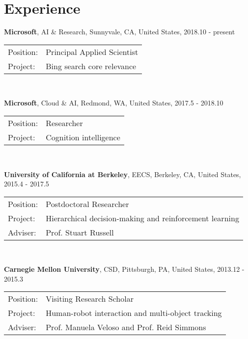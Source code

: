 \documentclass[letterpaper,10pt]{article}
\renewenvironment{itemize}{
  \begin{list}{}{
    \setlength{\leftmargin}{1.5em}
  }
}{
  \end{list}
}
\begin{document}
\section*{Experience}
\begin{itemize}
	\item \textbf{Microsoft}, AI \& Research, Sunnyvale, CA, United States, 2018.10 - present \\
	      \begin{tabular}{ll}
		      Position: & Principal Applied Scientist   \\
		      Project:  & Bing search core relevance \\
	      \end{tabular} \\
	\item \textbf{Microsoft}, Cloud \& AI, Redmond, WA, United States, 2017.5 - 2018.10 \\
	      \begin{tabular}{ll}
		      Position: & Researcher             \\
		      Project:  & Cognition intelligence \\
	      \end{tabular} \\
	\item \textbf{University of California at Berkeley}, EECS, Berkeley, CA, United States, 2015.4 - 2017.5 \\
	      \begin{tabular}{ll}
		      Position: & Postdoctoral Researcher                                 \\
		      Project:  & Hierarchical decision-making and reinforcement learning \\
		      Adviser:  & Prof. Stuart Russell                                    \\
	      \end{tabular} \\
	\item \textbf{Carnegie Mellon University}, CSD, Pittsburgh, PA, United States, 2013.12 - 2015.3 \\
	      \begin{tabular}{ll}
		      Position: & Visiting Research Scholar                         \\
		      Project:  & Human-robot interaction and multi-object tracking \\
		      Adviser:  & Prof. Manuela Veloso and Prof. Reid Simmons       \\
	      \end{tabular} \\

\end{itemize}
\end{document}
